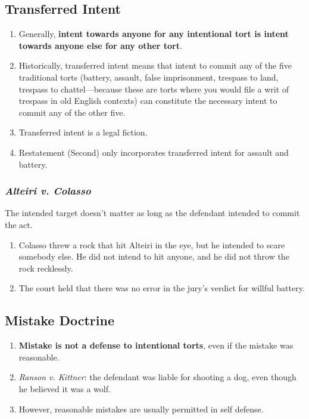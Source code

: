 \subsection{Transferred Intent}

\begin{enumerate}
    \item Generally, \textbf{intent towards anyone for any intentional tort is 
    intent towards anyone else for any other tort}.
    \item Historically, transferred intent means that intent to commit any of 
    the five traditional torts (battery, assault, false imprisonment, trespass 
    to land, trespass to chattel---because these are torts where you would 
    file a writ of trespass in old English contexts) can constitute the 
    necessary intent to commit any of the other five.
    \item Transferred intent is a legal fiction.
    \item Restatement (Second) only incorporates transferred intent for 
    assault and battery.
\end{enumerate}

\subsubsection{\emph{Alteiri v. Colasso}}

The intended target doesn't matter as long as the defendant intended to commit 
the act.

\begin{enumerate}
    \item Colasso threw a rock that hit Alteiri in the eye, but he intended to 
    scare somebody else. He did not intend to hit anyone, and he did not throw 
    the rock recklessly.
    \item The court held that there was no error in the jury's verdict for 
    willful battery.
\end{enumerate}

\subsection{Mistake Doctrine}

\begin{enumerate}
    \item \textbf{Mistake is not a defense to intentional torts}, even if the 
    mistake was reasonable.
    \item \emph{Ranson v. Kittner}: the defendant was liable for shooting a 
    dog, even though he believed it was a wolf.
    \item However, reasonable mistakes are usually permitted in self defense.
\end{enumerate}

